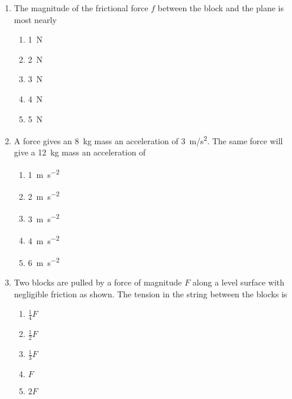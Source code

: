 \documentclass{../../oss-apphys}
\begin{document}
\begin{multicols}{2}
\begin{enumerate}[resume,leftmargin=18pt]
  \item The magnitude of the frictional force $f$ between the block and the
    plane is most nearly
    \begin{enumerate}[noitemsep,topsep=0pt,leftmargin=18pt,label=(\Alph*)]
    \item\SI{1}{\newton}
    \item\SI{2}{\newton}
    \item\SI{3}{\newton}
    \item\SI{4}{\newton}
    \item\SI{5}{\newton}
    \end{enumerate}
    \columnbreak
    
  \item A force gives an \SI{8}{\kilo\gram} mass an acceleration of
    \SI{3}{m/s^2}. The same force will give a \SI{12}{\kilo\gram} mass an
    acceleration of
    \begin{enumerate}[noitemsep,topsep=0pt,leftmargin=18pt,label=(\Alph*)]
    \item\SI{1}{\metre\per\second^2}
    \item\SI{2}{\metre\per\second^2}
    \item\SI{3}{\metre\per\second^2}
    \item\SI{4}{\metre\per\second^2}
    \item\SI{6}{\metre\per\second^2}
    \end{enumerate}

  \item Two blocks are pulled by a force of magnitude $F$ along a level surface
    with negligible friction as shown. The tension in the string between the
    blocks is
    \begin{center}
      \vspace{-.1in}
    \end{center}
    \begin{enumerate}[noitemsep,topsep=0pt,leftmargin=18pt,label=(\Alph*)]
    \item $\displaystyle\frac{1}{4}F$
    \item $\displaystyle\frac{1}{2}F$
    \item $\displaystyle\frac{1}{3}F$
    \item $F$
    \item $2F$
    \end{enumerate}
    

\end{enumerate}
\end{multicols}
\end{document}
